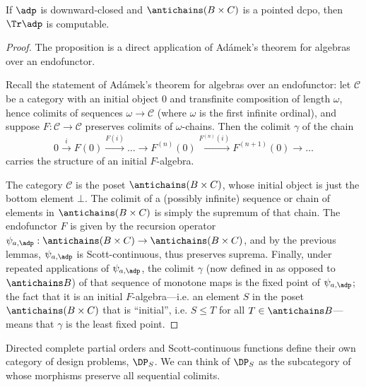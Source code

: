 

\begin{proposition}
    If $\adp$ is downward-closed and $\antichains (B \times C)$ is a pointed dcpo, then $\Tr \adp$ is computable.
\end{proposition}

\begin{proof}
    The proposition is a direct application of Ad\'amek's theorem for algebras over an endofunctor.

    Recall the statement of Ad\'amek's theorem for algebras over an endofunctor: let $\mathcal{C}$ be a category with an initial object $0$ and transfinite composition of length $\omega$, hence colimits of sequences $\omega \to \mathcal{C}$ (where $\omega$ is the first infinite ordinal), and suppose $F: \mathcal{C} \to \mathcal{C}$ preserves colimits of $\omega$-chains. Then the colimit $\gamma$ of the chain \[0 \overset{i}{\to} F(0) \overset{F(i)}{\to} \ldots \to F^{(n)}(0) \overset{F^{(n)}(i)}{\to} F^{(n+1)}(0) \to \ldots\] carries the structure of an initial $F$-algebra.

    The category $\mathcal{C}$ is the poset $\antichains (B \times C)$, whose initial object is just the bottom element $\bot$. The colimit of a (possibly infinite) sequence or chain of elements in $\antichains (B\times C)$ is simply the supremum of that chain. The endofunctor $F$ is given by the recursion operator $\psi_{a,\adp} : \antichains (B\times C) \to \antichains (B\times C)$, and by the previous lemmas, $\psi_{a,\adp}$ is Scott-continuous, thus preserves suprema. Finally, under repeated applications of $\psi_{a,\adp}$, the colimit $\gamma$ (now defined in \Pos as opposed to $\antichains B$) of that sequence of monotone maps is the fixed point of $\psi_{a,\adp}$; the fact that it is an initial $F$-algebra---i.e. an element $S$ in the poset $\antichains (B\times C)$ that is ``initial'', i.e. $S \leq T$ for all $T \in \antichains B$---means that $\gamma$ is the least fixed point.
\end{proof}


Directed complete partial orders and Scott-continuous functions define their own category of design problems, $\DP_S$. We can think of $\DP_S$ as the subcategory of \DP whose morphisms preserve all sequential colimits.



